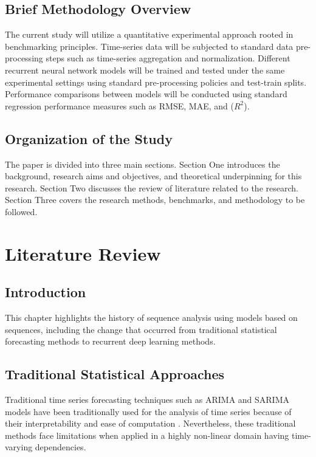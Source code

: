 \documentclass[12pt]{report}
\begin{document}
\section{Brief Methodology Overview}

The current study will utilize a quantitative experimental approach rooted in benchmarking principles. Time-series data will be subjected to standard data pre-processing steps such as time-series aggregation and normalization. Different recurrent neural network models will be trained and tested under the same experimental settings using standard pre-processing policies and test-train splits. Performance comparisons between models will be conducted using standard regression performance measures such as RMSE, MAE, and ($R^2$).


\section{Organization of the Study}

The paper is divided into three main sections. Section One introduces the background, research aims and objectives, and theoretical underpinning for this research. Section Two discusses the review of literature related to the research. Section Three covers the research methods, benchmarks, and methodology to be followed.


\chapter{Literature Review}

\section{Introduction}

This chapter highlights the history of sequence analysis using models based on sequences, including the change that occurred from traditional statistical forecasting methods to recurrent deep learning methods.



\section{Traditional Statistical Approaches}

Traditional time series forecasting techniques such as ARIMA and SARIMA models have been traditionally used for the analysis of time series because of their interpretability and ease of computation \cite{taylor2015, box2015, hyndman2018}. Nevertheless, these traditional methods face limitations when applied in a highly non-linear domain having time-varying dependencies.
\end{document}

